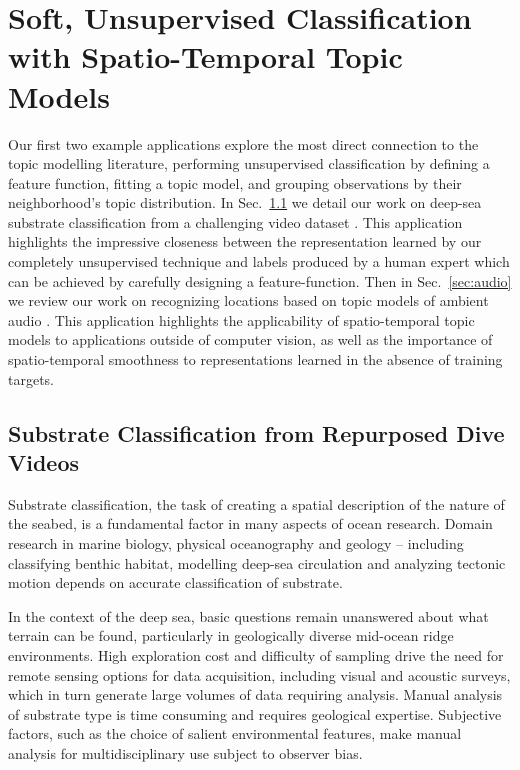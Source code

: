 
\chapter{Soft, Unsupervised Classification with Spatio-Temporal Topic Models} \label{ch:topic-models-examples}
Our first two example applications explore the most direct connection to the topic modelling literature, performing unsupervised classification by defining a feature function, fitting a topic model, and grouping observations by their neighborhood's topic distribution. In Sec.~\ref{sec:substrate} we detail our work on deep-sea substrate classification from a challenging video dataset \citep{Kalmbach2016}. This application highlights the impressive closeness between the representation learned by our completely unsupervised technique and labels produced by a human expert which can be achieved by carefully designing a feature-function. Then in Sec.~\ref{sec:audio} we review our work on recognizing locations based on topic models of ambient audio \citep{Kalmbach2013}. This application highlights the applicability of spatio-temporal topic models to applications outside of computer vision, as well as the importance of spatio-temporal smoothness to representations learned in the absence of training targets.

\section{Substrate Classification from Repurposed Dive Videos} \label{sec:substrate}

Substrate classification, the task of creating a spatial description of the nature of the seabed, is a fundamental factor in many aspects of ocean research.
Domain research in marine biology, physical oceanography and geology -- including classifying benthic habitat, modelling deep-sea circulation and analyzing tectonic motion depends on accurate classification of substrate.

In the context of the deep sea, basic questions remain unanswered about what terrain can be found, particularly in geologically diverse mid-ocean ridge environments. High exploration cost and difficulty of sampling drive the need for remote sensing options for data acquisition, including visual and acoustic surveys, which in turn generate large volumes of data requiring analysis.
Manual analysis of substrate type is time consuming and requires geological expertise. Subjective factors, such as the choice of salient environmental features, make manual analysis for multidisciplinary use subject to observer bias.

